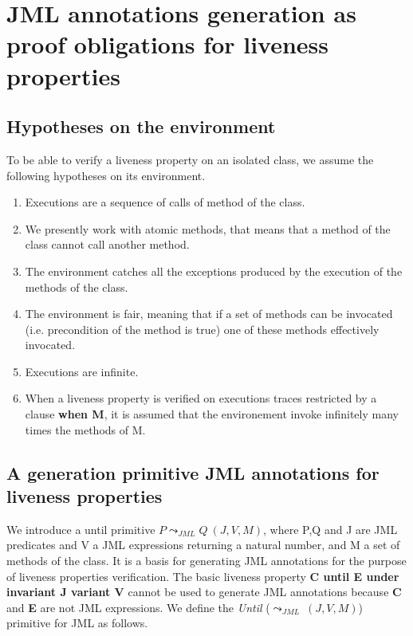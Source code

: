 \section{JML annotations generation as proof obligations for liveness properties}\label{sec-until}

\subsection{Hypotheses on the environment}

\label{sec-until-environment}

To be able to verify a liveness property on an isolated class, we assume the following hypotheses on its environment.
\begin{enumerate}
\item Executions are a sequence of calls of method of the class. 
\item We presently work with atomic methods, that means that a method of the class cannot call another method.
\item The environment catches all the exceptions produced by the execution of the methods of the class.
\item The environment is fair, meaning that if a set of methods can be invocated (i.e. precondition of the method is true) one of these methods effectively invocated.
\item Executions are infinite.
\item When a liveness property is verified on executions traces restricted by a clause \textbf{when M}, it is assumed that the environement  invoke infinitely many times the methods of M.
\end{enumerate} 


\subsection{A generation primitive JML annotations for liveness properties}




We introduce a until primitive $P\leadsto_{JML}Q~(J,V,M)$, where P,Q and J are JML predicates and V a JML expressions returning a natural number, and M a set of methods of the class.  It is a basis for generating JML annotations for the purpose  of  liveness properties verification. The basic liveness property \textbf{C until E under invariant J variant V} cannot be used to generate JML annotations because \textbf{C} and \textbf{E} are not JML expressions. 
We define the \textit{Until}  ($\leadsto_{JML}~(J,V,M)$) primitive for JML as follows.


